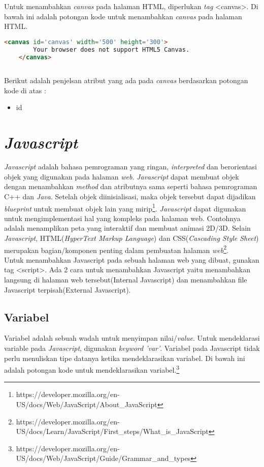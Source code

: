 Untuk menambahkan \textit{canvas} pada halaman HTML, diperlukan \textit{tag} <canvas>. Di bawah ini adalah potongan kode untuk menambahkan \textit{canvas} pada halaman HTML. 

\begin{lstlisting}[language=HTML, caption=Menambahkan \textit{canvas}]
	<canvas id='canvas' width='500' height='300'>
		Your browser does not support HTML5 Canvas.
	</canvas>
	
\end{lstlisting}


Berikut adalah penjelsan atribut yang ada pada \textit{canvas} berdasarkan potongan kode di atas : 
\begin{itemize}
	\item id
\end{itemize}


\section{\textit{\textit{Javascript}}}
\label{sec:Javascript}
\textit{Javascript} adalah bahasa pemrograman yang ringan, \textit{interpreted} dan berorientasi objek yang digunakan pada halaman \textit{web}. \textit{Javascript} dapat membuat objek dengan menambahkan \textit{method} dan atributnya sama seperti bahasa pemrograman C++ dan \textit{Java}. Setelah objek diinisialisasi, maka objek tersebut dapat dijadikan \textit{blueprint} untuk membuat objek lain yang mirip\footnote{https://developer.mozilla.org/en-US/docs/Web/JavaScript/About\_JavaScript}. \textit{Javascript} dapat digunakan untuk mengimplementasi hal yang kompleks pada halaman web. Contohnya adalah menamplikan peta yang interaktif dan membuat animasi 2D/3D. Selain \textit{Javascript}, HTML(\textit{HyperText Markup Language}) dan CSS(\textit{Cascading Style Sheet}) merupakan bagian/komponen penting dalam pembuatan halaman \textit{web}\footnote{https://developer.mozilla.org/en-US/docs/Learn/JavaScript/First\_steps/What\_is\_JavaScript}.\\

Untuk menambahkan Javascript pada sebuah halaman web yang dibuat, gunakan tag <script>. Ada 2 cara untuk menambahkan Javascript yaitu menambahkan langsung di halaman web tersebut(Internal Javascript) dan menambahkan file Javascript terpisah(External Javascript).

\subsection{Variabel}
Variabel adalah sebuah wadah untuk menyimpan nilai/\textit{value}. Untuk mendeklarasi variable pada \textit{Javascript}, digunakan \textit{keyword 'var'}. Variabel pada Javascript tidak perlu menuliskan tipe datanya ketika mendeklarasikan variabel. Di bawah ini adalah potongan kode untuk mendeklarasikan variabel.\footnote{https://developer.mozilla.org/en-US/docs/Web/JavaScript/Guide/Grammar\_and\_types}

